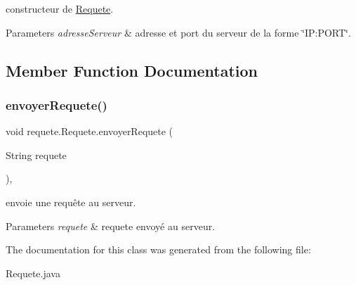 constructeur de \hyperlink{classrequete_1_1Requete}{Requete}. 


\begin{DoxyParams}{Parameters}
{\em adresse\+Serveur} & adresse et port du serveur de la forme \char`\"{}\+I\+P\+:\+P\+O\+R\+T\char`\"{}. \\
\hline
\end{DoxyParams}


\subsection{Member Function Documentation}
\mbox{\label{classrequete_1_1Requete_a4adc60edaa26be2f8d9b4e4b0a1377cd}} 
\subsubsection{\texorpdfstring{envoyer\+Requete()}{envoyerRequete()}}
{\footnotesize\ttfamily void requete.\+Requete.\+envoyer\+Requete (\begin{DoxyParamCaption}\item[{String}]{requete }\end{DoxyParamCaption})\hspace{0.3cm}{\ttfamily [inline]}, {\ttfamily [protected]}}



envoie une requête au serveur. 


\begin{DoxyParams}{Parameters}
{\em requete} & requete envoyé au serveur. \\
\hline
\end{DoxyParams}


The documentation for this class was generated from the following file\+:\begin{DoxyCompactItemize}
\item 
Requete.\+java\end{DoxyCompactItemize}
